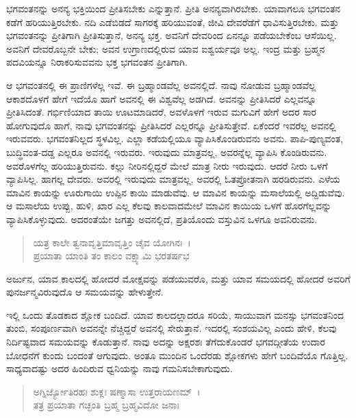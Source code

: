 ಭಗವಂತನನ್ನು ಅನನ್ಯ ಭಕ್ತಿಯಿಂದ ಪ್ರೀತಿಸಬೇಕು ಎನ್ನುತ್ತಾನೆ. ಪ್ರೀತಿ ಅನನ್ಯವಾಗಿರಬೇಕು. ಯಾವಾಗಲೂ ಭಗವಂತನ ಕಡೆಗೆ ಹರಿಯುತ್ತಿರಬೇಕು. ನದಿ ಎಡೆಬಿಡದೆ ಸಾಗರಕ್ಕೆ ಹರಿಯುವಂತೆ, ಜೀವಿ ದೇವರೆಡೆಗೆ ಧಾವಿಸುತ್ತಿರಬೇಕು. ಮತ್ತು ಭಗವಂತನನ್ನು ಪ್ರೀತಿಗಾಗಿ ಪ್ರೀತಿಸುತ್ತಾನೆ, ಅನನ್ಯ ಭಕ್ತ. ಅವನಿಗೆ ದೇವರಿಂದ ಏನನ್ನೂ ಪಡೆಯಬೇಕೆಂಬ ಆಸೆಯಿಲ್ಲ. ಅವನಿಗೆ ದೇವರೊಬ್ಬನೇ ಬೇಕು; ಅವನ ಉಗ್ರಾಣದಲ್ಲಿರುವ ಯಾವ ಐಶ್ವರ್ಯವೂ ಅಲ್ಲ. ಇಂದ್ರ ಮತ್ತು ಬ್ರಹ್ಮನ ಪದವಿಯನ್ನೂ ನಿರಾಕರಿಸುವವನು ಭಕ್ತ ಭಗವಂತನ ಪ್ರೀತಿಗಾಗಿ.

ಆ ಭಗವಂತನಲ್ಲಿ ಈ ಪ್ರಾಣಿಗಳೆಲ್ಲ ಇವೆ. ಈ ಬ್ರಹ್ಮಾಂಡವೆಲ್ಲ ಅವನಲ್ಲಿದೆ. ನಾವು ನೋಡುವ ಬ್ರಹ್ಮಾಂಡವೆಲ್ಲ ಆಕಾಶದೊಳಗೆ ಹೇಗೆ ಇದೆಯೊ ಹಾಗೆ ಅವನಲ್ಲಿ ಈ ವಿಶ್ವವೆಲ್ಲ ಅಡಗಿದೆ. ಅವನನ್ನು ಪ್ರೀತಿಸಿದರೆ ಎಲ್ಲವನ್ನೂ ಪ್ರೀತಿಸಿದಂತೆ. ಗರ್ಭಿಣಿಯಾದ ತಾಯಿ ಊಟಮಾಡಿದರೆ, ಅವಳೊಳಗೆ ಇರುವ ಮಗುವಿಗೆ ಹೇಗೆ ಅದರ ಸಾರ ಹೋಗುವುದೊ ಹಾಗೆ, ನಾವು ಭಗವಂತನನ್ನು ಪ್ರೀತಿಸಿದರೆ ಎಲ್ಲರನ್ನೂ ಪ್ರೀತಿಸುತ್ತೇವೆ. ಏಕೆಂದರೆ ಇವರೆಲ್ಲ ಅವನಲ್ಲಿ ಇರುವವರು. ಭಗವಂತನಿಲ್ಲದ ಸ್ಥಳವಿಲ್ಲ. ಎಲ್ಲಾ ಕಡೆಯಲ್ಲಿಯೂ ವ್ಯಾಪಿಸಿಕೊಂಡಿರುವನು ಅವನು. ಪಾಪಿ-ಪುಣ್ಯವಂತ, ಬುದ್ಧಿವಂತ-ದಡ್ಡ ಎಲ್ಲರೂ ಅವನಲ್ಲಿ ಇರುವರು. ಇರುವುದು ಮಾತ್ರವಲ್ಲ, ಅವರನ್ನೆಲ್ಲ ವ್ಯಾಪಿಸಿ ಕೊಂಡಿರುವನು. ಅವರೊಳಗೆಲ್ಲ ಹರಿಯುತ್ತಿರುವನು. ಕಲ್ಲು ನೀರಿನಲ್ಲಿದ್ದರೆ ಮೇಲೆ ಮಾತ್ರ ನೀರು ಇರುವುದು. ಆದರೆ ನೀರು ಒಳಗೆ ವ್ಯಾಪಿಸಿಲ್ಲ. ಹಾಗಲ್ಲ ದೇವರು. ಅವರಲ್ಲಿ ಇರುವುದು ಮಾತ್ರವಲ್ಲ, ಅವರಲ್ಲಿ ಓತಪ್ರೋತನಾಗಿ ಹರಡಿರುವನು. ಎಳೆಯ ಮಾವಿನ ಕಾಯನ್ನು ಊರುಗಾಯಿ ಉಪ್ಪಿನ ಕಾಯಿ ಮಾಡುವೆವು. ಆ ಮಾವಿನ ಕಾಯನ್ನು ಮಸಾಲೆಯಲ್ಲಿ ಅದ್ದಿಡುವೆವು. ಆ ಮಸಾಲೆಯ ಉಪ್ಪು, ಹುಳಿ, ಖಾರ ಎಲ್ಲ ಕೆಲವು ಕಾಲವಾದಮೇಲೆ ಮಾವಿನ ಕಾಯಿಯ ಒಳಗೆ ಹೊರಗೆಲ್ಲವನ್ನು ವ್ಯಾಪಿಸಿಕೊಳ್ಳುವುದು. ಅದರಂತೆಯೇ ಜಗತ್ತು ಅವನಲ್ಲಿದೆ, ಪ್ರತಿಯೊಂದು ವಸ್ತುವಿನ ಒಳಗೂ ಅವನಿರುವನು.

\begin{verse}
ಯತ್ರ ಕಾಲೇ ತ್ವನಾವೃತ್ತಿಮಾವೃತ್ತಿಂ ಚೈವ ಯೋಗಿನಃ~।\\ಪ್ರಯಾತಾ ಯಾಂತಿ ತಂ ಕಾಲಂ ವಕ್ಷ್ಯಾಮಿ ಭರತರ್ಷಭ 
\end{verse}

{\small ಅರ್ಜುನ, ಯಾವ ಕಾಲದಲ್ಲಿ ಹೋದರೆ ಮೋಕ್ಷವನ್ನು ಪಡೆಯುವರೊ, ಮತ್ತು ಯಾವ ಸಮಯದಲ್ಲಿ ಹೋದರೆ ಅವರಿಗೆ ಪುನರ್ಜನ್ಮವಿರುವುದೊ ಆ ಸಮಯವನ್ನು ಹೇಳುತ್ತೇನೆ.}

ಇಲ್ಲಿ ಒಂದು ತೊಡಕಾದ ಶ್ಲೋಕ ಬಂದಿದೆ. ಯಾವ ಕಾಲದಲ್ಲಾದರೂ ಸರಿಯೆ, ಸಾಯುವಾಗ ಮನಸ್ಸು ಭಗವಂತನಿಂದ ತುಂಬಿ, ಸಂಪೂರ್ಣವಾಗಿ ಅವನನ್ನೇ ನೆಚ್ಚಿದ್ದರೆ ಅವನಲ್ಲಿ ಸೇರುತ್ತಾನೆ. ಇದರಲ್ಲಿ ಸಂಶಯವಿಲ್ಲ ಎಂದು ಹೇಳಿ, ಕೆಲವು ನಿರ್ದಿಷ್ಟವಾದ ಸಮಯವನ್ನು ಕೊಡುತ್ತಾನೆ. ನಾವು ಅದನ್ನು ಅಕ್ಷರಶಃ ತೆಗೆದುಕೊಂಡರೆ ಭಗವದ್ಗೀತೆಯ ಉದಾರ ಬೋಧನೆಗೆ ಕುಂದು ಬಂದಂತೆ ಆಗುವುದು. ಅಂತೂ ಮುಂದಿನ ಒಂದೆರಡು ಶ್ಲೋಕಗಳು ಹೇಗೆ ಬಂದಿವೆಯೊ ಗೊತ್ತಿಲ್ಲ. ಸಾಧ್ಯವಾದಷ್ಟು ಅದರ ಹಿಂದಿರುವ ಧ್ವನಿಯನ್ನು ನಾವು ಗಮನಿಸಬೇಕಾಗುವುದು.

\begin{verse}
ಅಗ್ನಿರ್ಜ್ಯೋತಿರಹಃ ಶುಕ್ಲಃ ಷಣ್ಮಾಸಾ ಉತ್ತರಾಯಣಮ್~।\\ತತ್ರ ಪ್ರಯಾತಾ ಗಚ್ಛಂತಿ ಬ್ರಹ್ಮ ಬ್ರಹ್ಮವಿದೋ ಜನಾಃ 
\end{verse}

